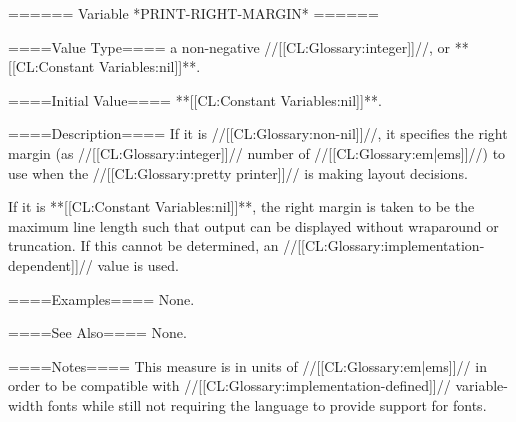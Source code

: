 ====== Variable *PRINT-RIGHT-MARGIN* ======

====Value Type====
a non-negative //[[CL:Glossary:integer]]//, or **[[CL:Constant Variables:nil]]**.

====Initial Value====
**[[CL:Constant Variables:nil]]**.

====Description====
If it is //[[CL:Glossary:non-nil]]//, it specifies the right margin (as //[[CL:Glossary:integer]]// number of //[[CL:Glossary:em|ems]]//) to use when the //[[CL:Glossary:pretty printer]]// is making layout decisions.

If it is **[[CL:Constant Variables:nil]]**, the right margin is taken to be the maximum line length such that output can be displayed without wraparound or truncation. If this cannot be determined, an //[[CL:Glossary:implementation-dependent]]// value is used.

====Examples====
None.

====See Also====
None.

====Notes====
This measure is in units of //[[CL:Glossary:em|ems]]// in order to be compatible with //[[CL:Glossary:implementation-defined]]// variable-width fonts while still not requiring the language to provide support for fonts.

